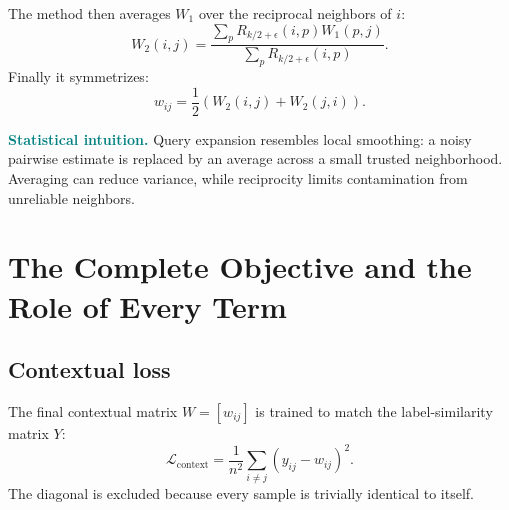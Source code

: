 \documentclass[11pt,oneside,openany]{book}
\theoremstyle{myplain}
\theoremstyle{definition}
\newcommand{\paperEq}[1]{\tag{P#1}}
\begin{document}
The method then averages $W_1$ over the reciprocal neighbors of $i$:
\begin{equation}
  W_2(i,j)=
  \frac{\sum_p R_{k/2+\epsilon}(i,p)W_1(p,j)}
       {\sum_p R_{k/2+\epsilon}(i,p)}.
  \label{eq:w2}
\end{equation}
Finally it symmetrizes:
\begin{equation*}
  \boxed{w_{ij}=\frac12\left(W_2(i,j)+W_2(j,i)\right).}
\paperEq{4}
\label{eq:qe}
\end{equation*}

\begin{center}
\end{center}
\noindent\textbf{\textcolor{teal}{Statistical intuition.}}
Query expansion resembles local smoothing: a noisy pairwise estimate is replaced by an average across a small trusted neighborhood. Averaging can reduce variance, while reciprocity limits contamination from unreliable neighbors.


\chapter{The Complete Objective and the Role of Every Term}
\label{chap:objective}

\section{Contextual loss}

The final contextual matrix $W=[w_{ij}]$ is trained to match the label-similarity matrix $Y$:
\begin{equation*}
  \boxed{\mathcal L_{\mathrm{context}}
  =\frac{1}{n^2}\sum_{i\ne j}(y_{ij}-w_{ij})^2.}
\paperEq{5}
\label{eq:lcontext}
\end{equation*}
The diagonal is excluded because every sample is trivially identical to itself.
\end{document}
